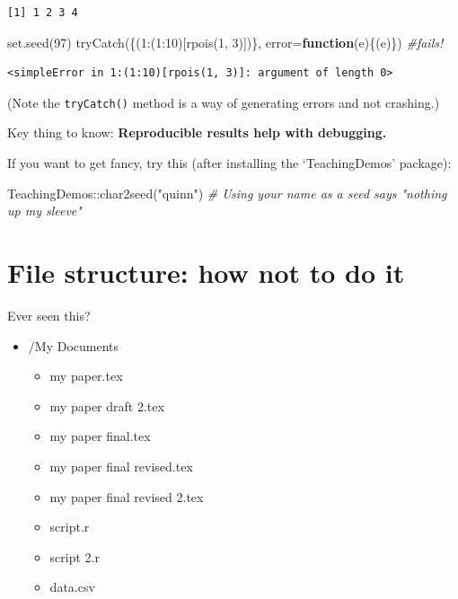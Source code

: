 \documentclass[
  letterpaper,
  DIV=11,
  numbers=noendperiod]{scrreprt}
\newenvironment{Shaded}{\begin{snugshade}}{\end{snugshade}}
\newcommand{\AttributeTok}[1]{\textcolor[rgb]{0.49,0.56,0.16}{#1}}
\newcommand{\CommentTok}[1]{\textcolor[rgb]{0.38,0.63,0.69}{\textit{#1}}}
\newcommand{\ControlFlowTok}[1]{\textcolor[rgb]{0.00,0.44,0.13}{\textbf{#1}}}
\newcommand{\DecValTok}[1]{\textcolor[rgb]{0.25,0.63,0.44}{#1}}
\newcommand{\FunctionTok}[1]{\textcolor[rgb]{0.02,0.16,0.49}{#1}}
\newcommand{\NormalTok}[1]{\textcolor[rgb]{0.00,0.44,0.13}{#1}}
\newcommand{\SpecialCharTok}[1]{\textcolor[rgb]{0.25,0.44,0.63}{#1}}
\newcommand{\StringTok}[1]{\textcolor[rgb]{0.25,0.44,0.63}{#1}}
\providecommand{\tightlist}{%
  \setlength{\itemsep}{0pt}\setlength{\parskip}{0pt}}\usepackage{longtable,booktabs,array}
\begin{document}
\begin{verbatim}
[1] 1 2 3 4
\end{verbatim}

\begin{Shaded}
\begin{Highlighting}[]
\FunctionTok{set.seed}\NormalTok{(}\DecValTok{97}\NormalTok{)}
\FunctionTok{tryCatch}\NormalTok{(\{(}\DecValTok{1}\SpecialCharTok{:}\NormalTok{(}\DecValTok{1}\SpecialCharTok{:}\DecValTok{10}\NormalTok{)[}\FunctionTok{rpois}\NormalTok{(}\DecValTok{1}\NormalTok{, }\DecValTok{3}\NormalTok{)])\}, }\AttributeTok{error=}\ControlFlowTok{function}\NormalTok{(e)\{(e)\}) }\CommentTok{\#fails!}
\end{Highlighting}
\end{Shaded}

\begin{verbatim}
<simpleError in 1:(1:10)[rpois(1, 3)]: argument of length 0>
\end{verbatim}

(Note the \texttt{tryCatch()} method is a way of generating errors and
not crashing.)

Key thing to know: \textbf{Reproducible results help with debugging.}

If you want to get fancy, try this (after installing the `TeachingDemos'
package):

\begin{Shaded}
\begin{Highlighting}[]
\NormalTok{TeachingDemos}\SpecialCharTok{::}\FunctionTok{char2seed}\NormalTok{(}\StringTok{"quinn"}\NormalTok{) }\CommentTok{\# Using your name as a seed says "nothing up my sleeve"}
\end{Highlighting}
\end{Shaded}

\hypertarget{file-structure-how-not-to-do-it}{%
\section{File structure: how not to do
it}\label{file-structure-how-not-to-do-it}}

Ever seen this?

\begin{itemize}
\tightlist
\item
  /My Documents

  \begin{itemize}
  \tightlist
  \item
    my paper.tex
  \item
    my paper draft 2.tex
  \item
    my paper final.tex
  \item
    my paper final revised.tex
  \item
    my paper final revised 2.tex
  \item
    script.r
  \item
    script 2.r
  \item
    data.csv
  \end{itemize}
\end{itemize}
\end{document}
